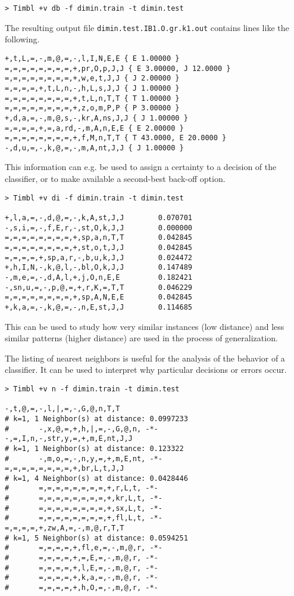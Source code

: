 \documentclass{report}
\begin{document}
{\footnotesize
\begin{verbatim}
> Timbl +v db -f dimin.train -t dimin.test
\end{verbatim}
}

The resulting output file {\tt dimin.test.IB1.O.gr.k1.out} contains
lines like the following.

{\footnotesize
\begin{verbatim}
+,t,L,=,-,m,@,=,-,l,I,N,E,E { E 1.00000 }
=,=,=,=,=,=,=,=,+,pr,O,p,J,J { E 3.00000, J 12.0000 }
=,=,=,=,=,=,=,=,+,w,e,t,J,J { J 2.00000 }
=,=,=,=,+,t,L,n,-,h,L,s,J,J { J 1.00000 }
=,=,=,=,=,=,=,=,+,t,L,n,T,T { T 1.00000 }
=,=,=,=,=,=,=,=,+,z,o,m,P,P { P 3.00000 }
+,d,a,=,-,m,@,s,-,kr,A,ns,J,J { J 1.00000 }
=,=,=,=,+,=,a,rd,-,m,A,n,E,E { E 2.00000 }
=,=,=,=,=,=,=,=,+,f,M,n,T,T { T 43.0000, E 20.0000 }
-,d,u,=,-,k,@,=,-,m,A,nt,J,J { J 1.00000 }
\end{verbatim}
}

This information can e.g. be used to assign a certainty to a decision
of the classifier, or to make available a second-best back-off option.

{\footnotesize
\begin{verbatim}
> Timbl +v di -f dimin.train -t dimin.test

+,l,a,=,-,d,@,=,-,k,A,st,J,J        0.070701
-,s,i,=,-,f,E,r,-,st,O,k,J,J        0.000000
=,=,=,=,=,=,=,=,+,sp,a,n,T,T        0.042845
=,=,=,=,=,=,=,=,+,st,o,t,J,J        0.042845
=,=,=,=,+,sp,a,r,-,b,u,k,J,J        0.024472
+,h,I,N,-,k,@,l,-,bl,O,k,J,J        0.147489
-,m,e,=,-,d,A,l,+,j,O,n,E,E         0.182421
-,sn,u,=,-,p,@,=,+,r,K,=,T,T        0.046229
=,=,=,=,=,=,=,=,+,sp,A,N,E,E        0.042845
+,k,a,=,-,k,@,=,-,n,E,st,J,J        0.114685        
\end{verbatim}
}

This can be used to study how very similar instances (low distance) and
less similar patterns (higher distance) are used in the process of
generalization.

The listing of nearest neighbors is useful for the analysis of the
behavior of a classifier. It can be used to interpret why particular
decisions or errors occur.

{\footnotesize
\begin{verbatim}
> Timbl +v n -f dimin.train -t dimin.test

-,t,@,=,-,l,|,=,-,G,@,n,T,T
# k=1, 1 Neighbor(s) at distance: 0.0997233
#       -,x,@,=,+,h,|,=,-,G,@,n, -*-
-,=,I,n,-,str,y,=,+,m,E,nt,J,J
# k=1, 1 Neighbor(s) at distance: 0.123322
#       -,m,o,=,-,n,y,=,+,m,E,nt, -*-
=,=,=,=,=,=,=,=,+,br,L,t,J,J
# k=1, 4 Neighbor(s) at distance: 0.0428446
#       =,=,=,=,=,=,=,=,+,r,L,t, -*-
#       =,=,=,=,=,=,=,=,+,kr,L,t, -*-
#       =,=,=,=,=,=,=,=,+,sx,L,t, -*-
#       =,=,=,=,=,=,=,=,+,fl,L,t, -*-
=,=,=,=,+,zw,A,=,-,m,@,r,T,T
# k=1, 5 Neighbor(s) at distance: 0.0594251
#       =,=,=,=,+,fl,e,=,-,m,@,r, -*-
#       =,=,=,=,+,=,E,=,-,m,@,r, -*-
#       =,=,=,=,+,l,E,=,-,m,@,r, -*-
#       =,=,=,=,+,k,a,=,-,m,@,r, -*-
#       =,=,=,=,+,h,O,=,-,m,@,r, -*-                    
\end{verbatim}
}
\end{document}
